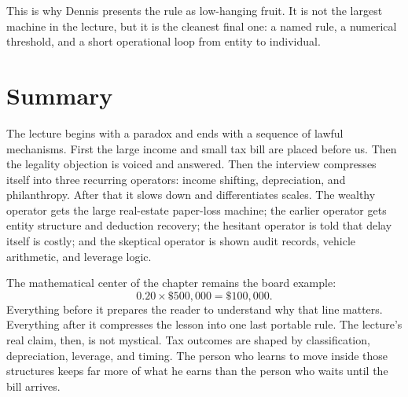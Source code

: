 This is why Dennis presents the rule as low-hanging fruit. It is not the largest machine in the lecture, but it is the cleanest final one: a named rule, a numerical threshold, and a short operational loop from entity to individual.

\section{Summary}

The lecture begins with a paradox and ends with a sequence of lawful mechanisms. First the large income and small tax bill are placed before us. Then the legality objection is voiced and answered. Then the interview compresses itself into three recurring operators: income shifting, depreciation, and philanthropy. After that it slows down and differentiates scales. The wealthy operator gets the large real-estate paper-loss machine; the earlier operator gets entity structure and deduction recovery; the hesitant operator is told that delay itself is costly; and the skeptical operator is shown audit records, vehicle arithmetic, and leverage logic.

The mathematical center of the chapter remains the board example:
\[
0.20\times \$500{,}000=\$100{,}000.
\]
Everything before it prepares the reader to understand why that line matters. Everything after it compresses the lesson into one last portable rule. The lecture's real claim, then, is not mystical. Tax outcomes are shaped by classification, depreciation, leverage, and timing. The person who learns to move inside those structures keeps far more of what he earns than the person who waits until the bill arrives.